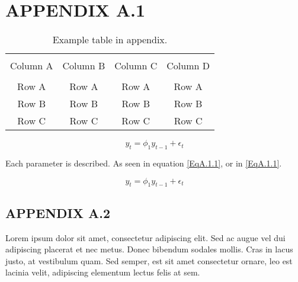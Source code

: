 \chapter{APPENDIX A.1}
\renewcommand{\theequation}{A.1.\arabic{equation}}
\setcounter{equation}{0}

\begin{table*}[!ht]
	{\setlength{\tabcolsep}{14pt}
		\caption{Example table in appendix.}
		\begin{center}
			\vspace{-6mm}
			\begin{tabular}{cccc}
				\hline \\[-2.45ex] \hline \\[-2.1ex]
				Column A & Column B & Column C & Column D \\
				\hline \\[-1.8ex]
				Row A & Row A & Row A & Row A \\
				Row B & Row B & Row B & Row B \\
				Row C & Row C & Row C & Row C \\
				[-0ex] \hline
			\end{tabular}
			\vspace{-6mm}
		\end{center}
		\label{TableA.1}}
\end{table*}

\begin{equation}
y_{t} = \phi_{1} y_{t-1} + \epsilon_{t}
\label{EqA.1.1}
\end{equation}

Each parameter is described. As seen in equation \eqref{EqA.1.1}, or in \ref{EqA.1.1}.

\begin{equation}
y_{t} = \phi_{1} y_{t-1} + \epsilon_{t}
\label{EqA.1.2}
\end{equation}

\vspace*{12pt}

\section*{APPENDIX A.2}
\renewcommand{\theequation}{A.2.\arabic{equation}}
\setcounter{equation}{0}

Lorem ipsum dolor sit amet, consectetur adipiscing elit. Sed ac augue vel dui adipiscing placerat et nec metus. Donec bibendum sodales mollis. Cras in lacus justo, at vestibulum quam. Sed semper, est sit amet consectetur ornare, leo est lacinia velit, adipiscing elementum lectus felis at sem.

